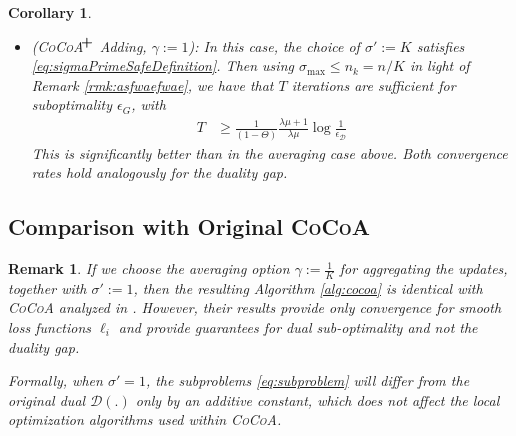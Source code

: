 \documentclass{article}
\newcommand{\cocoa}{\textsc{CoCoA}\xspace}
\newcommand{\cocoap}{\textsc{CoCoA$\!^{\bf \textbf{\footnotesize+}}$}\xspace}
\newcommand{\calG}{G}
\newcommand{\0}{ {\bf 0}}
\newcommand{\bD}{\mathcal{D}}
\theoremstyle{plain}
\newtheorem{remark}[theorem]{Remark}
\newtheorem{corollary}[theorem]{Corollary}
\theoremstyle{definition}
\begin{document}
{\begin{corollary}
\begin{itemize}
\item
(\cocoap Adding, $\gamma := 1$):
In this case, the choice of $\sigma':=K$ satisfies 
\eqref{eq:sigmaPrimeSafeDefinition}.
Then using $\sigma_{\max} \le n_k = n/K$ in light of Remark \ref{rmk:asfwaefwae}, we have that $T$ iterations are sufficient for suboptimality %
$\epsilon_\calG$, with
\begin{align*}
T
&\geq
\tfrac{1}
   {
(1-\Theta)}
\tfrac
{\lambda\mu+1}
{ \lambda\mu }
    \log \tfrac1{\epsilon_\bD}
\end{align*}
This is significantly better than in the averaging case above.
Both convergence rates hold analogously for the duality gap.

\end{itemize}
\end{corollary}

 
\subsection{Comparison with Original \cocoa}

\begin{remark}%

If we choose the averaging option
$\gamma :=\frac1K$ for aggregating the updates, together with $\sigma' := 1$,
then the resulting Algorithm \ref{alg:cocoa} is identical with \cocoa analyzed in \cite{jaggi2014communication}. 
However, their results provide only convergence for smooth loss functions $\ell_i$ and provide guarantees for dual sub-optimality and not the duality gap.

Formally, when $\sigma' = 1$, the subproblems \eqref{eq:subproblem} will differ from the original dual $\bD(.)$ only by an additive constant, which does not affect the local optimization algorithms used within \cocoa.
\end{remark}


} %
\end{document}
